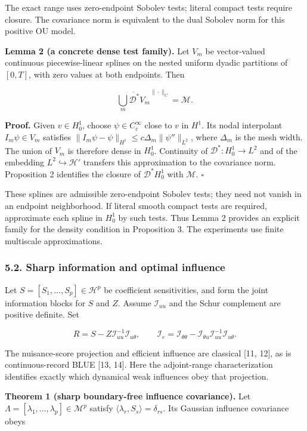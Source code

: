 \documentclass[
  american,
  11pt,
]{article}
\begin{document}
The exact range uses zero-endpoint Sobolev tests; literal compact tests
require closure. The covariance norm is equivalent to the dual Sobolev
norm for this positive OU model.

\textbf{Lemma 2 (a concrete dense test family).} Let \(V_m\) be
vector-valued continuous piecewise-linear splines on the nested uniform
dyadic partitions of \([0,T]\), with zero values at both endpoints. Then

\[
\overline{\bigcup_m\mathcal D^*V_m}^{\|\cdot\|_C}=\mathcal M.
\]

\textbf{Proof.} Given \(v\in H_0^1\), choose \(\psi\in C_c^\infty\)
close to \(v\) in \(H^1\). Its nodal interpolant \(I_m\psi\in V_m\)
satisfies \(\|I_m\psi-\psi\|_{H^1}\leq c\Delta_m\|\psi''\|_{L^2}\),
where \(\Delta_m\) is the mesh width. The union of \(V_m\) is therefore
dense in \(H_0^1\). Continuity of \(\mathcal D^*:H_0^1\to L^2\) and of
the embedding \(L^2\hookrightarrow\mathcal H'\) transfers this
approximation to the covariance norm. Proposition 2 identifies the
closure of \(\mathcal D^*H_0^1\) with \(\mathcal M\). \(\square\)

These splines are admissible zero-endpoint Sobolev tests; they need not
vanish in an endpoint neighborhood. If literal smooth compact tests are
required, approximate each spline in \(H_0^1\) by such tests. Thus Lemma
2 provides an explicit family for the density condition in Proposition
3. The experiments use finite multiscale approximations.

\subsubsection{5.2. Sharp information and optimal
influence}\label{sharp-information-and-optimal-influence}

Let \(S=[S_1,\ldots,S_p]\in\mathcal H^p\) be coefficient sensitivities,
and form the joint information blocks for \(S\) and \(Z\). Assume
\(\mathcal I_{uu}\) and the Schur complement are positive definite. Set

\[
R=S-Z\mathcal I_{uu}^{-1}\mathcal I_{u\theta},
\qquad
\mathcal I_e=\mathcal I_{\theta\theta}
-\mathcal I_{\theta u}\mathcal I_{uu}^{-1}\mathcal I_{u\theta}.
\]

The nuisance-score projection and efficient influence are classical
{[}11, 12{]}, as is continuous-record BLUE {[}13, 14{]}. Here the
adjoint-range characterization identifies exactly which dynamical weak
influences obey that projection.

\textbf{Theorem 1 (sharp boundary-free influence covariance).} Let
\(\Lambda=[\lambda_1,\ldots,\lambda_p]\in\mathcal M^p\) satisfy
\(\langle\lambda_r,S_s\rangle=\delta_{rs}\). Its Gaussian influence
covariance obeys
\end{document}
